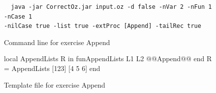 \documentclass[11pt,a4paper,twoside,openright]{report}
\begin{document}
\begin{figure}[!ht]
  \begin{lstlisting}
  java -jar CorrectOz.jar input.oz -d false -nVar 2 -nFun 1 -nCase 1 
-nilCase true -list true -extProc [Append] -tailRec true
  \end{lstlisting}
 \caption{Command line for exercise Append}
 \label{fig:append}
\end{figure}

\begin{figure}[!ht]
  \begin{OZ}
  local AppendLists R in
    fun{AppendLists L1 L2}
      @@Append@@
    end
  R = {AppendLists [123] [4 5 6]}
  end
  \end{OZ}
 \caption{Template file for exercise Append}
 \label{fig:append_temp}
\end{figure}
\end{document}
